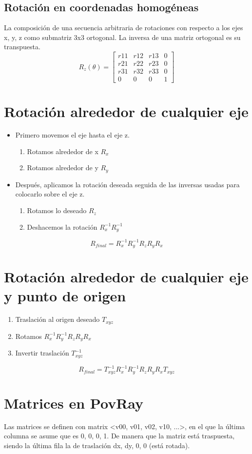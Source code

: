 \subsection{Rotación en coordenadas homogéneas}
La composición de una secuencia arbitraria de rotaciones con respecto a los ejes x, y, z como submatriz 3x3 ortogonal. La inversa de una matriz ortogonal es su transpuesta.
$$R_z(\theta)=\left[\begin{matrix}
r11 & r12 & r13 & 0 \\ 
r21 & r22 & r23 & 0 \\ 
r31 & r32 & r33 & 0 \\
0 & 0 & 0 & 1
\end{matrix}\right]$$
\pagebreak

\section{Rotación alrededor de cualquier eje}
\begin{itemize}
    \item Primero movemos el eje hasta el eje z.
    \begin{enumerate}
        \item Rotamos alrededor de x $R_x$
        \item Rotamos alrededor de y $R_y$
    \end{enumerate}
    \item Después, aplicamos la rotación deseada seguida de las inversas usadas para colocarlo sobre el eje z.
    \begin{enumerate}
        \item Rotamos lo deseado $R_z$
        \item Deshacemos la rotación $R_x^{-1}R_y^{-1}$
    \end{enumerate}
\end{itemize}
$$R_{final}=R_x^{-1}R_y^{-1}R_zR_yR_x$$

\section{Rotación alrededor de cualquier eje y punto de origen}
\begin{enumerate}
    \item Traslación al origen deseado $T_{xyz}$
    \item Rotamos $R_x^{-1}R_y^{-1}R_zR_yR_x$
    \item Invertir traslación $T_{xyz}^{-1}$
\end{enumerate}
$$R_{final}=T_{xyz}^{-1}R_x^{-1}R_y^{-1}R_zR_yR_xT_{xyz}$$

\section{Matrices en PovRay}
Las matrices se definen con matrix <v00, v01, v02, v10, ...>, en el que la última columna se asume que es 0, 0, 0, 1. De manera que la matriz está traspuesta, siendo la última fila la de traslación dx, dy, 0, 0 (está rotada).